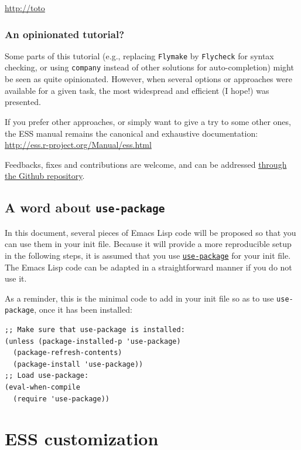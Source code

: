 \documentclass[11pt]{article}
\begin{document}
\begin{center}
\url{http://toto}
\end{center}


\subsubsection{An opinionated tutorial?}
\label{sec:org67ea909}
Some parts of this tutorial (e.g., replacing \texttt{Flymake} by \texttt{Flycheck} for syntax checking, or using \texttt{company} instead of other solutions for auto-completion) might be seen as quite opinionated. However, when several options or approaches were available for a given task, the most widespread and efficient (I hope!) was presented.

If you prefer other approaches, or simply want to give a try to some other ones, the ESS manual remains the canonical and exhaustive documentation: \url{http://ess.r-project.org/Manual/ess.html}

Feedbacks, fixes and contributions are welcome, and can be addressed \href{https://github.com/ess-intro/presentation-ess-customization/issues}{through the Github repository}.

\subsection{A word about \texttt{use-package}}
\label{sec:org48c369a}
In this document, several pieces of Emacs Lisp code will be proposed so that you can use them in your init file. Because it will provide a more reproducible setup in the following steps, it is assumed that you use \href{https://jwiegley.github.io/use-package/}{\texttt{use-package}} for your init file. The Emacs Lisp code can be adapted in a straightforward manner if you do not use it.

As a reminder, this is the minimal code to add in your init file so as to use \texttt{use-package}, once it has been installed:

\begin{verbatim}
;; Make sure that use-package is installed:
(unless (package-installed-p 'use-package)
  (package-refresh-contents)
  (package-install 'use-package))
;; Load use-package:
(eval-when-compile
  (require 'use-package))
\end{verbatim}

\section{ESS customization}
\label{sec:org3838954}
\end{document}
